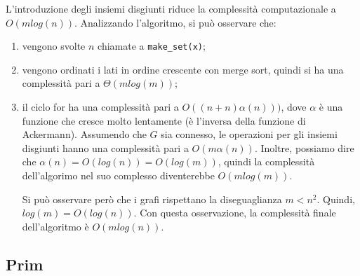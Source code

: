 L'introduzione degli insiemi disgiunti riduce la complessità computazionale
a $O(mlog(n))$. Analizzando l'algoritmo, si può osservare che:
\begin{enumerate}
    \item vengono svolte $n$ chiamate a \verb|make_set(x)|;
    \item vengono ordinati i lati in ordine crescente con merge sort,
    quindi si ha una complessità pari a $\Theta(mlog(m))$;
    \item il ciclo for ha una complessità pari a $O((n + n)\alpha(n)))$,
    dove $\alpha$ è una funzione che cresce molto lentamente (è l'inversa
    della funzione di Ackermann). Assumendo che $G$ sia connesso, le
    operazioni per gli insiemi disgiunti hanno una complessità pari a
    $O(m\alpha(n))$. Inoltre, possiamo dire che
    $\alpha(n) = O(log(n)) = O(log(m))$, quindi la complessità dell'algorimo
    nel suo complesso diventerebbe $O(m log(m))$.

    Si può osservare però che i grafi rispettano la diseguaglianza $m < n^2$.
    Quindi, $log(m) = O(log(n))$. Con questa osservazione, la complessità
    finale dell'algoritmo è $O(mlog(n))$.
\end{enumerate}

\subsection{Prim}